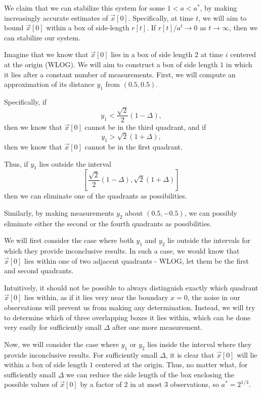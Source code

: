 \documentclass[letterpaper]{article}
\theoremstyle{remark}
\newcommand\note[1]{\marginpar{\textcolor{red}{#1}}}
\begin{document}
We claim that we can stabilize this system for some $1 < a < a^*$, by making increasingly accurate estimates of $\vec{x}[0]$. Specifically, at time $t$, we will aim to bound $\vec{x}[0]$ within a box of side-length $r[t]$. If $r[t] / a^t \to 0$ as $t \to \infty$, then we can stabilize our system.

Imagine that we know that $\vec{x}[0]$ lies in a box of side length $2$ at time $i$ centered at the origin (WLOG). We will aim to construct a box of side length $1$ in which it lies after a constant number of measurements. First, we will compute an approximation of its distance $y_1$ from $(0.5, 0.5)$.

Specifically, if
\[
    y_1 < \frac{\sqrt{2}}{2} (1 - \Delta),
\]
then we know that $\vec{x}[0]$ cannot be in the third quadrant, and if
\[
    y_1 > \sqrt{2} (1 + \Delta),
\]
then we know that $\vec{x}[0]$ cannot be in the first quadrant.

Thus, if $y_1$ lies outside the interval
\[
    \left[\frac{\sqrt{2}}{2} (1 - \Delta), \sqrt{2} (1 + \Delta)\right]
\]
then we can eliminate one of the quadrants as possibilities.

Similarly, by making measurements $y_2$ about $(0.5, -0.5)$, we can possibly eliminate either the second or the fourth quadrants as possibilities.

We will first consider the case where both $y_1$ and $y_2$ lie outside the intervals for which they provide inconclusive results. In such a case, we would know that $\vec{x}[0]$ lies within one of two adjacent quadrants - WLOG, let them be the first and second quadrants.

Intuitively, it should not be possible to always distinguish exactly which quadrant $\vec{x}[0]$ lies within, as if it lies very near the boundary $x = 0$, the noise in our observations will prevent us from making any determination. Instead, we will try to determine which of three overlapping boxes it lies within, which can be done very easily for sufficiently small $\Delta$ after one more measurement. \note{Draw diagram}

Now, we will consider the case where $y_1$ or $y_2$ lies inside the interval where they provide inconclusive results. For sufficiently small $\Delta$, it is clear that $\vec{x}[0]$ will lie within a box of side length $1$ centered at the origin. Thus, no matter what, for sufficiently small $\Delta$ we can reduce the side length of the box enclosing the possible values of $\vec{x}[0]$ by a factor of $2$ in at most $3$ observations, so $a^* = 2^{1/3}$.
\end{document}
